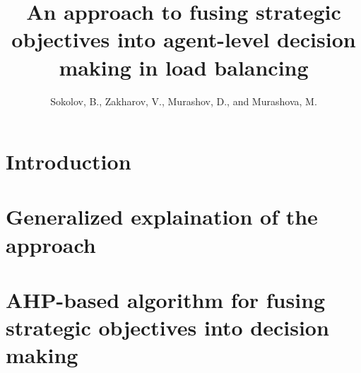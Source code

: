 \documentclass{article}
\author{Sokolov, B., Zakharov, V., Murashov, D., and Murashova, M.}
\title{An approach to fusing strategic objectives into agent-level decision making in load balancing}
\begin{document}
    \maketitle

    

    \section{Introduction}

    

    

    \section{Generalized explaination of the approach}
    \label{sect:approachGen}

    

    \section{AHP-based algorithm for fusing strategic objectives into decision making}
    \label{sect:approachFormal}

    

    
    \label{sect:relayRace}

    
    \label{sect:conclusion}

    

    \medskip

    

    
\end{document}
